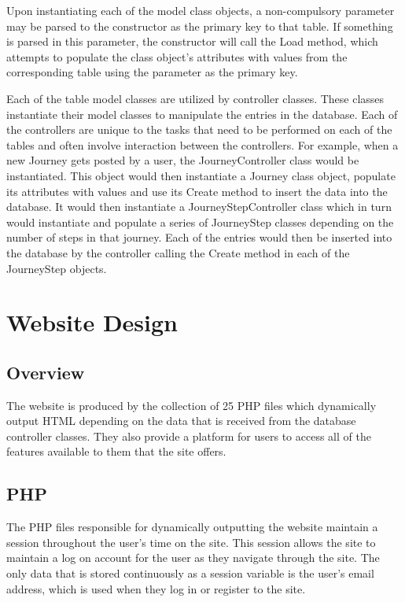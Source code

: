 		Upon instantiating each of the model class objects, a non-compulsory parameter may be parsed to the constructor as the primary key to that table. If something is parsed in this parameter, the constructor will call the Load method, which attempts to populate the class object's attributes with values from the corresponding table using the parameter as the primary key.
		
		Each of the table model classes are utilized by controller classes. These classes instantiate their model classes to manipulate the entries in the database. Each of the controllers are unique to the tasks that need to be performed on each of the tables and often involve interaction between the controllers. For example, when a new Journey gets posted by a user, the Journey\textunderscore Controller class would be instantiated. This object would then instantiate a Journey class object, populate its attributes with values and use its Create method to insert the data into the database. It would then instantiate a Journey\textunderscore Step\textunderscore Controller class which in turn would instantiate and populate a series of Journey\textunderscore Step classes depending on the number of steps in that journey. Each of the entries would then be inserted into the database by the controller calling the Create method in each of the Journey\textunderscore Step objects. 		
		
\section{Website Design}
	\subsection{Overview}
		The website is produced by the collection of 25 PHP files which dynamically output HTML depending on the data that is received from the database controller classes. They also provide a platform for users to access all of the features available to them that the site offers.
	\subsection{PHP}
		The PHP files responsible for dynamically outputting the website maintain a session throughout the user's time on the site. This session allows the site to maintain a log on account for the user as they navigate through the site. The only data that is stored continuously as a session variable is the user's email address, which is used when they log in or register to the site.
		
